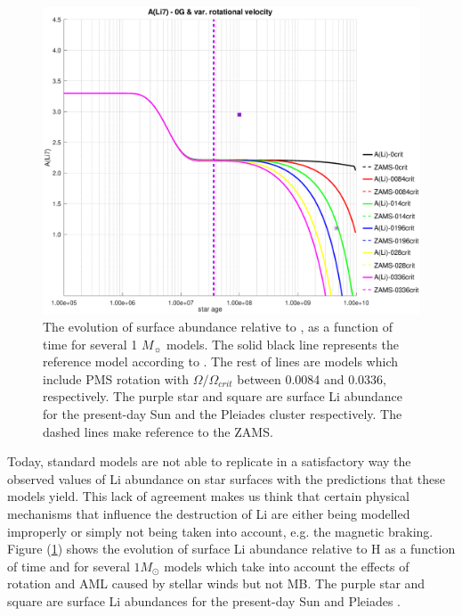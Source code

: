 \documentclass[fleqn,usenatbib]{mnras}
\begin{document}
\begin{figure}
	\includegraphics[trim = 35mm 15mm 20mm 15mm, clip, width=\columnwidth]{figures/li_var_vel_0_0g.eps}
    \caption{The evolution of surface  abundance relative to , as a function of time for several 1 $M_{\sun}$ models. The solid black line represents the reference model according to \citet{Choi2016}. The rest of lines are models which include PMS rotation with $\Omega / \Omega_{crit}$ between 0.0084 and 0.0336, respectively. The purple star and square are surface Li abundance for the present-day Sun \citep{Asplund2009} and the Pleiades cluster \citep{Sestito2005} respectively. The dashed lines make reference to the ZAMS.}
    \label{fig:li_var_vel_0g}
\end{figure}

Today, standard models are not able to replicate in a satisfactory way the observed values of Li abundance on star surfaces with the predictions that these models yield. This lack of agreement makes us think that certain physical mechanisms that influence the destruction of Li are either being modelled improperly or simply not being taken into account, e.g. the magnetic braking. Figure (\ref{fig:li_var_vel_0g}) shows the evolution of surface Li abundance relative to H as a function of time and for several $1M_{\odot}$ models which take into account the effects of rotation and AML caused by stellar winds but not MB. The purple star and square are surface Li abundances for the present-day Sun \citep{Asplund2009} and Pleiades \citep{Sestito2005}.\par
\end{document}
